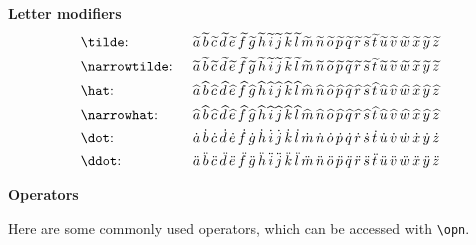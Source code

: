 \documentclass{myassignment}
\begin{document}
\textbf{Letter modifiers}
\begin{align*}
    &\text{\texttt{\textbackslash tilde}: } &&\widetilde{a}\,\widetilde{b}\,\widetilde{c}\,\widetilde{d}\,\widetilde{e}\,\widetilde{f}\,\widetilde{g}\,\widetilde{h}\,\widetilde{i}\,\widetilde{j}\,\widetilde{k}\,\widetilde{l}\,\widetilde{m}\,\widetilde{n}\,\widetilde{o}\,\widetilde{p}\,\widetilde{q}\,\widetilde{r}\,\widetilde{s}\,\widetilde{t}\,\widetilde{u}\,\widetilde{v}\,\widetilde{w}\,\widetilde{x}\,\widetilde{y}\,\widetilde{z} \\
    &\text{\texttt{\textbackslash narrowtilde}: } &&\widetilde{a}\,\widetilde{b}\,\widetilde{c}\,\widetilde{d}\,\widetilde{e}\,\widetilde{f}\,\widetilde{g}\,\widetilde{h}\,\widetilde{i}\,\widetilde{j}\,\widetilde{k}\,\widetilde{l}\,\widetilde{m}\,\widetilde{n}\,\widetilde{o}\,\widetilde{p}\,\widetilde{q}\,\widetilde{r}\,\widetilde{s}\,\widetilde{t}\,\widetilde{u}\,\widetilde{v}\,\widetilde{w}\,\widetilde{x}\,\widetilde{y}\,\widetilde{z} \\
    &\text{\texttt{\textbackslash hat}: } &&\widehat{a}\,\widehat{b}\,\widehat{c}\,\widehat{d}\,\widehat{e}\,\widehat{f}\,\widehat{g}\,\widehat{h}\,\widehat{i}\,\widehat{j}\,\widehat{k}\,\widehat{l}\,\widehat{m}\,\widehat{n}\,\widehat{o}\,\widehat{p}\,\widehat{q}\,\widehat{r}\,\widehat{s}\,\widehat{t}\,\widehat{u}\,\widehat{v}\,\widehat{w}\,\widehat{x}\,\widehat{y}\,\widehat{z} \\
    &\text{\texttt{\textbackslash narrowhat}: } &&\widehat{a}\,\widehat{b}\,\widehat{c}\,\widehat{d}\,\widehat{e}\,\widehat{f}\,\widehat{g}\,\widehat{h}\,\widehat{i}\,\widehat{j}\,\widehat{k}\,\widehat{l}\,\widehat{m}\,\widehat{n}\,\widehat{o}\,\widehat{p}\,\widehat{q}\,\widehat{r}\,\widehat{s}\,\widehat{t}\,\widehat{u}\,\widehat{v}\,\widehat{w}\,\widehat{x}\,\widehat{y}\,\widehat{z} \\
    &\text{\texttt{\textbackslash dot}: } &&\dot{a}\,\dot{b}\,\dot{c}\,\dot{d}\,\dot{e}\,\dot{f}\,\dot{g}\,\dot{h}\,\dot{i}\,\dot{j}\,\dot{k}\,\dot{l}\,\dot{m}\,\dot{n}\,\dot{o}\,\dot{p}\,\dot{q}\,\dot{r}\,\dot{s}\,\dot{t}\,\dot{u}\,\dot{v}\,\dot{w}\,\dot{x}\,\dot{y}\,\dot{z} \\
    &\text{\texttt{\textbackslash ddot}: } &&\ddot{a}\,\ddot{b}\,\ddot{c}\,\ddot{d}\,\ddot{e}\,\ddot{f}\,\ddot{g}\,\ddot{h}\,\ddot{i}\,\ddot{j}\,\ddot{k}\,\ddot{l}\,\ddot{m}\,\ddot{n}\,\ddot{o}\,\ddot{p}\,\ddot{q}\,\ddot{r}\,\ddot{s}\,\ddot{t}\,\ddot{u}\,\ddot{v}\,\ddot{w}\,\ddot{x}\,\ddot{y}\,\ddot{z}
\end{align*}

\textbf{Operators}

Here are some commonly used operators, which can be accessed with \texttt{\textbackslash opn}.
\end{document}
